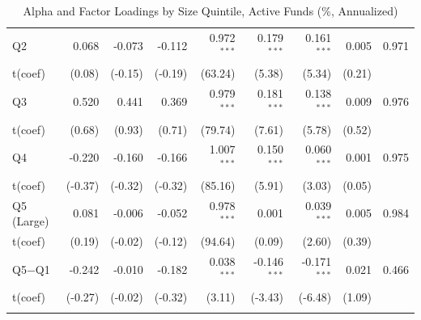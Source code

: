 \begin{table}[!htbp]
{\begin{tabular*}{\linewidth}{@{\extracolsep{\fill}}lrrrrrrrr}
\hspace{1em}Q2 & 0.068 & -0.073 & -0.112 & 0.972$^{***}$ & 0.179$^{***}$ & 0.161$^{***}$ & 0.005 & 0.971\\
\hspace{1em}t(coef) & (0.08) & (-0.15) & (-0.19) & (63.24) & (5.38) & (5.34) & (0.21) & \\
\hspace{1em}Q3 & 0.520 & 0.441 & 0.369 & 0.979$^{***}$ & 0.181$^{***}$ & 0.138$^{***}$ & 0.009 & 0.976\\
\hspace{1em}t(coef) & (0.68) & (0.93) & (0.71) & (79.74) & (7.61) & (5.78) & (0.52) & \\
\hspace{1em}Q4 & -0.220 & -0.160 & -0.166 & 1.007$^{***}$ & 0.150$^{***}$ & 0.060$^{***}$ & 0.001 & 0.975\\
\hspace{1em}t(coef) & (-0.37) & (-0.32) & (-0.32) & (85.16) & (5.91) & (3.03) & (0.05) & \\
\hspace{1em}Q5 (Large) & 0.081 & -0.006 & -0.052 & 0.978$^{***}$ & 0.001 & 0.039$^{***}$ & 0.005 & 0.984\\
\hspace{1em}t(coef) & (0.19) & (-0.02) & (-0.12) & (94.64) & (0.09) & (2.60) & (0.39) & \\
\hspace{1em}Q5$-$Q1 & -0.242 & -0.010 & -0.182 & 0.038$^{***}$ & -0.146$^{***}$ & -0.171$^{***}$ & 0.021 & 0.466\\
\hspace{1em}t(coef) & (-0.27) & (-0.02) & (-0.32) & (3.11) & (-3.43) & (-6.48) & (1.09) & \\
\addlinespace[0.3em]
\hline
\bottomrule
\end{tabular*}%
}\sbefit
\fi
\setlength{\tabletempwidth}{\wd\tabletempbox}
\ifdim\tabletempwidth>\linewidth\setlength{\tabletempwidth}{\linewidth}\fi
\begin{minipage}{\tabletempwidth}
\captionsetup{width=\linewidth}
\caption{Alpha and Factor Loadings by Size Quintile, Active Funds (\%, Annualized)}\label{tab:port_size_alpha}
\ifdim\wd\tabletempbox>\linewidth
  \resizebox{\linewidth}{!}{\usebox{\tabletempbox}}
\else
  \usebox{\tabletempbox}
\fi
\par\medskip
\begin{singlespace}\tablefont\noindent

\end{singlespace}
\end{minipage}
\end{table}

